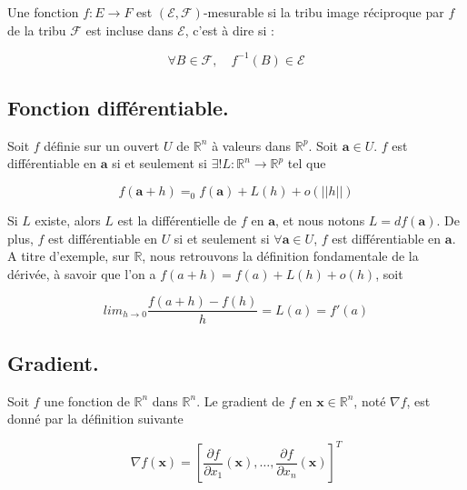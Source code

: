 \noindent Une fonction $f : E \rightarrow F$ est $(\mathcal{E}, \mathcal{F})$-mesurable si la tribu image réciproque par $f$ de la tribu $\mathcal{F}$ est incluse dans $\mathcal{E}$, c'est à dire si :

\begin{equation}
    \forall B \in \mathcal{F}, \quad f^{-1}(B) \in \mathcal{E} \nonumber
\end{equation}

\subsection{Fonction différentiable.} 

\noindent Soit $f$ définie sur un ouvert $U$ de $\mathbb{R}^n$ à valeurs dans $\mathbb{R}^{p}$. Soit $\boldsymbol{a} \in U$. $f$ est différentiable en $\boldsymbol{a}$ si et seulement si $\exists ! L : \mathbb{R}^n \rightarrow \mathbb{R}^p$ tel que 

\begin{equation}
    f(\boldsymbol{a} + h) =_{0} f(\boldsymbol{a}) + L(h) + o(||h||) 
\end{equation}

\noindent Si $L$ existe, alors $L$ est la différentielle de $f$ en $\boldsymbol{a}$, et nous notons $L = df(\boldsymbol{a})$. De plus, $f$ est différentiable en $U$ si et seulement si $\forall \boldsymbol{a} \in U$, $f$ est différentiable en $\boldsymbol{a}$. A titre d'exemple, sur $\mathbb{R}$, nous retrouvons la définition
fondamentale de la dérivée, à savoir que l'on a $f(a+h) = f(a) + L(h) + o(h)$, soit

\begin{equation}
    lim_{h \rightarrow 0} \frac{f(a+h) - f(h)}{h} = L(a) = f'(a)
\end{equation}

\subsection{Gradient.} 

\noindent Soit $f$ une fonction de $\mathbb{R}^{n}$ dans $\mathbb{R}^{n}$. Le gradient de $f$ en $\boldsymbol{x} \in \mathbb{R}^{n}$, noté $\nabla f$, est donné par la définition suivante 

\begin{equation}
    \nabla f(\boldsymbol{x}) = \left[ \frac{\partial f}{\partial x_1}(\boldsymbol{x}), \dots , \frac{\partial f}{\partial x_n}(\boldsymbol{x}) \right]^{T}
\end{equation}

